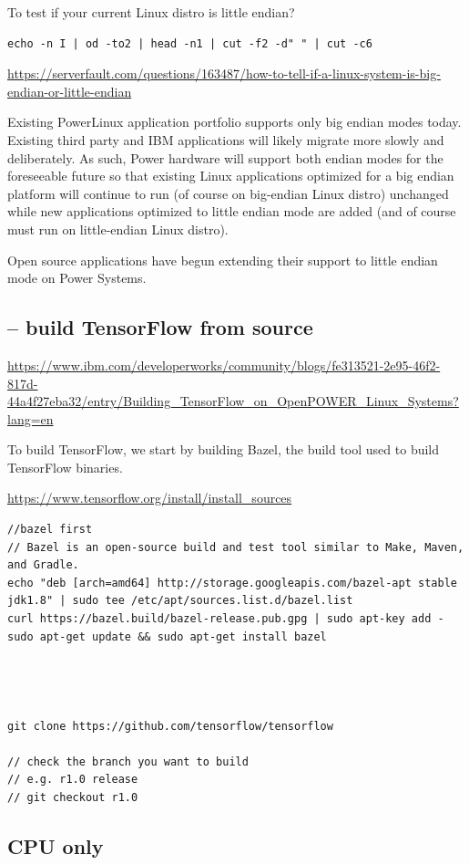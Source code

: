 To test if your current Linux distro is little endian?
\begin{verbatim}
echo -n I | od -to2 | head -n1 | cut -f2 -d" " | cut -c6 
\end{verbatim}
\url{https://serverfault.com/questions/163487/how-to-tell-if-a-linux-system-is-big-endian-or-little-endian}


Existing PowerLinux application portfolio supports only big endian modes today.
Existing third party and IBM applications will likely migrate more slowly and
deliberately.  As such, Power hardware will support both endian modes for the
foreseeable future so that existing Linux applications optimized for a big
endian platform will continue to run (of course on big-endian Linux distro)
unchanged while new applications optimized to little endian mode are added (and
of course must run on little-endian Linux distro).

Open source applications have begun extending their support to little endian
mode on Power Systems. 


\subsection{-- build TensorFlow from source}


\url{https://www.ibm.com/developerworks/community/blogs/fe313521-2e95-46f2-817d-44a4f27eba32/entry/Building_TensorFlow_on_OpenPOWER_Linux_Systems?lang=en}


To build TensorFlow, we start by building Bazel, the build tool used to build
TensorFlow binaries.

\url{https://www.tensorflow.org/install/install_sources}
\begin{verbatim}
//bazel first
// Bazel is an open-source build and test tool similar to Make, Maven, and Gradle.
echo "deb [arch=amd64] http://storage.googleapis.com/bazel-apt stable jdk1.8" | sudo tee /etc/apt/sources.list.d/bazel.list
curl https://bazel.build/bazel-release.pub.gpg | sudo apt-key add -
sudo apt-get update && sudo apt-get install bazel




git clone https://github.com/tensorflow/tensorflow 

// check the branch you want to build
// e.g. r1.0 release 
// git checkout r1.0

\end{verbatim}

\subsection{CPU only}

